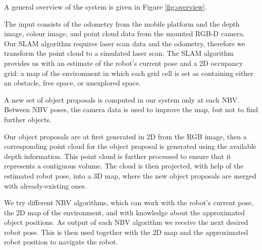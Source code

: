 A general overview of the system is given in Figure \ref{fig:overview}.

The input consists of the odometry from the mobile platform and the depth image, colour image, and point cloud data from the mounted RGB-D camera.
Our SLAM algorithm requires laser scan data and the odometry, therefore we transform the point cloud to a simulated laser scan.
The SLAM algorithm provides us with an estimate of the robot's current pose and a 2D occupancy grid: a map of the environment in which each grid cell is set as containing either an obstacle, free space, or unexplored space. 

A new set of object proposals is computed in our system only at each NBV.
Between NBV poses, the camera data is used to improve the map, but not to find further objects.

Our object proposals are at first generated in 2D from the RGB image, then a corresponding point cloud for the object proposal is generated using the available depth information.
This point cloud is further processed to ensure that it represents a contiguous volume.
The cloud is then projected, with help of the estimated robot pose, into a 3D map, where the new object proposals are merged with already-existing ones.

We try different NBV algorithms, which can work with the robot's current pose, the 2D map of the environment, and with knowledge about the approximated object positions.
As output of each NBV algorithm we receive the next desired robot pose.
This is then used together with the 2D map and the approximated robot position to navigate the robot.



